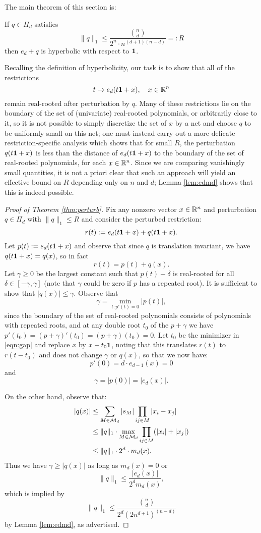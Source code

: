 The main theorem of this section is:
 \begin{theorem}\label{thm:perturb} If $q\in\Pi_d$ satisfies $$\|q\|_1\le
	 \frac{\binom{n}{d}}{2^n\cdot n^{(d+1)(n-d)}}=:R$$
	 then $e_d+q$ is hyperbolic with respect
 to $\mathbf{1}$.\end{theorem}
Recalling the definition of hyperbolicity, our task is to show that all of the
restrictions $$t\mapsto e_d(t\mathbf{1}+x),\quad x\in\mathbb{R}^n$$ remain real-rooted after perturbation by $q$.
Many of these restrictions lie on the boundary of the set of (univariate) real-rooted polynomials, 
 or arbitrarily close to it, so it is not possible to simply discretize the set of $x$ by a net
 and choose $q$ to be uniformly small on this net; one must instead carry out a more delicate restriction-specific analysis
 which shows that for small $R$, the perturbation $q(t\mathbf{1} +x)$ is less than the distance of $e_d(t\mathbf{1} + x)$
 to the boundary of the set of real-rooted polynomials, for each $x\in\mathbb{R}^n$.
Since we are comparing vanishingly small quantities, it is not a priori 
  clear that such an approach will yield an effective bound on $R$ depending only
  on $n$ and $d$; Lemma \ref{lem:edmd} shows that this is indeed possible.
\begin{proof}[Proof of Theorem \ref{thm:perturb}]
 Fix any nonzero vector $x\in\mathbb{R}^n$ and perturbation $q\in\Pi_d$ with $\|q\|_1\le R$ and consider the perturbed restriction:
 $$ r(t):= e_d(t\mathbf{1}+x)+q(t\mathbf{1}+x).$$
Let $p(t):=e_d(t\mathbf{1}+x)$ and observe that since $q$ is translation invariant, we have $q(t\mathbf{1}+x)=q(x)$, so in fact
$$r(t)=p(t)+q(x).$$
Let $\gamma\ge 0$ be the largest constant such that $p(t)+\delta$ is real-rooted for all $\delta\in[-\gamma,\gamma]$ (note that $\gamma$ could be zero if $p$ has a repeated root). It is sufficient to show that $|q(x)|\le \gamma$. Observe that 
\begin{equation}\label{eqn:gap}\gamma = \min_{t:p'(t)=0}|p(t)|,\end{equation}
since the boundary of the set of real-rooted polynomials consists of polynomials with repeated roots, and at any double root $t_0$ of the $p+\gamma$ we have $p'(t_0)=(p+\gamma)'(t_0)=(p+\gamma)(t_0)=0$. Let $t_0$ be the minimizer in \eqref{eqn:gap} and replace $x$ by $x-t_0\mathbf{1}$, noting that this translates $r(t)$ to $r(t-t_0)$ and does not change $\gamma$ or $q(x)$, so that we now have:
$$p'(0)=d\cdot e_{d-1}(x)=0$$
and
$$\gamma = |p(0)|=|e_d(x)|.$$

On the other hand, observe that:
\begin{align*}
|q(x)| &\le\sum_{M\in\mathcal{M}_d} |s_M|\prod_{ij\in M}|x_i-x_j|
\\&\le \|q\|_1\cdot\max_{M\in\mathcal{M}_d}\prod_{ij\in M}(|x_i|+|x_j|)
\\&\le \|q\|_1\cdot 2^d\cdot m_d(x).
\end{align*}
Thus we have $\gamma\ge |q(x)|$ as long as $m_d(x)=0$ or
$$ \|q\|_1\le \frac{|e_d(x)|}{2^dm_d(x)},$$
which is implied by
	$$ \|q\|_1\le \frac{\binom{n}{d}}{2^d(2n^{d+1})^{(n-d)}}$$
by Lemma \ref{lem:edmd}, as advertised.
\end{proof}

